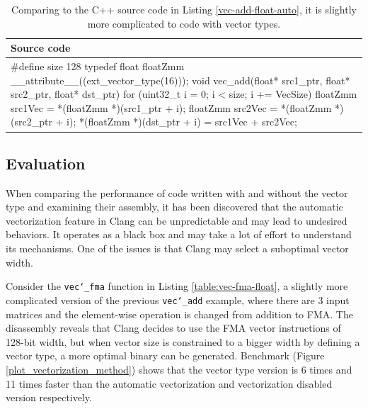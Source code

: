 \documentclass[logo,bsc,singlespacing,parskip]{infthesis}
\newenvironment{VerbatimCompact}
  {\vspace*{-2.5mm}\VerbatimEnvironment
   \par\Verbatim}
  {\endVerbatim\vspace*{-2.4mm}}
\begin{document}
\begin{table}[ht]\captionsetup{name=Listing}
\begin{tabular}{>{\raggedright\arraybackslash}p{14cm}}
    Source code\\
    \midrule
    \begin{VerbatimCompact}
#define size 128
typedef float floatZmm __attribute__((ext_vector_type(16)));
void vec_add(float* src1_ptr, float* src2_ptr, float* dst_ptr) {
    for (uint32_t i = 0; i < size; i += VecSize){
        floatZmm src1Vec = *(floatZmm *)(src1_ptr + i);
        floatZmm src2Vec = *(floatZmm *)(src2_ptr + i);
        *(floatZmm *)(dst_ptr + i) = src1Vec + src2Vec;
    }
}
\end{VerbatimCompact}
\end{tabular}
\caption{Comparing to the C++ source code in Listing \ref{vec-add-float-auto},
it is slightly more complicated to code with vector types.}
\label{vec-add-float-vecty}
\end{table}
\subsection{Evaluation}

\label{sec:vectorization-method-eval}
When comparing the performance of code written with and without the vector type
and examining their assembly, it has been discovered that the automatic
vectorization feature in Clang can be unpredictable and may lead to undesired
behaviors. It operates as a black box and may take a lot of effort to understand
its mechanisms. One of the issues is that Clang may select a suboptimal vector
width.

Consider the \texttt{vec\char`_fma} function in Listing \ref{table:vec-fma-float}, a
slightly more complicated version of the previous \texttt{vec\char`_add} example,
where there are 3 input matrices and the element-wise operation is changed from
addition to FMA. The disassembly reveals that Clang decides to use the FMA vector
instructions of 128-bit width, but when vector size is constrained to a bigger
width by defining a vector type, a more optimal binary can be generated. Benchmark
(Figure \ref{plot_vectorization_method}) shows that the vector type version is 6
times and 11 times faster than the automatic vectorization and vectorization
disabled version respectively.
\end{document}
